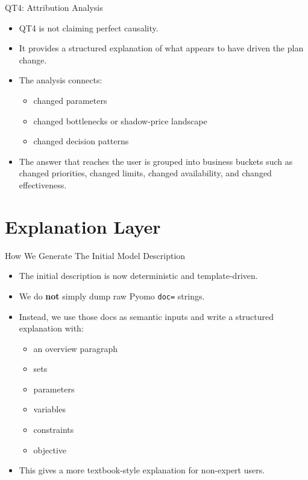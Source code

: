 \documentclass[10pt]{beamer}
\newcommand{\func}[1]{\texttt{#1}}
\begin{document}
\begin{frame}{QT4: Attribution Analysis}
  \begin{itemize}
    \item QT4 is not claiming perfect causality.
    \item It provides a structured explanation of what appears to have driven the plan change.
    \item The analysis connects:
    \begin{itemize}
      \item changed parameters
      \item changed bottlenecks or shadow-price landscape
      \item changed decision patterns
    \end{itemize}
    \item The answer that reaches the user is grouped into business buckets such as changed priorities, changed limits, changed availability, and changed effectiveness.
  \end{itemize}
\end{frame}

\section{Explanation Layer}

\begin{frame}{How We Generate The Initial Model Description}
  \begin{itemize}
    \item The initial description is now deterministic and template-driven.
    \item We do \textbf{not} simply dump raw Pyomo \func{doc=} strings.
    \item Instead, we use those docs as semantic inputs and write a structured explanation with:
    \begin{itemize}
      \item an overview paragraph
      \item sets
      \item parameters
      \item variables
      \item constraints
      \item objective
    \end{itemize}
    \item This gives a more textbook-style explanation for non-expert users.
  \end{itemize}
\end{frame}
\end{document}
